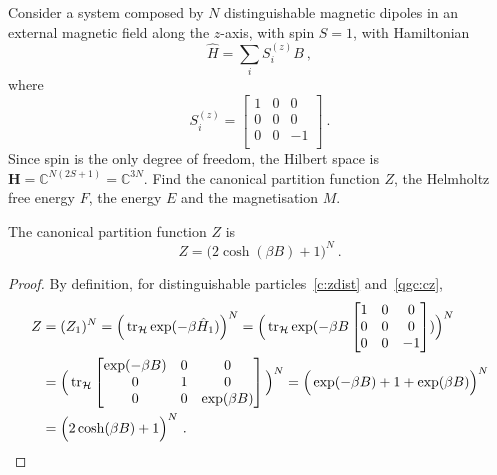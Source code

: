     \begin{exercise}
        Consider a system composed by $N$ distinguishable magnetic dipoles in an external magnetic field along the $z$-axis, with spin $S = 1$, with Hamiltonian 
        \begin{equation*}
            \hat H = \sum_i S^{(z)}_i B ~,
        \end{equation*}
        where
        \begin{equation*}
            S^{(z)}_i = \begin{bmatrix}
                1 & 0 & 0 \\
                0 & 0 & 0 \\
                0 & 0 & - 1 \\
            \end{bmatrix} ~.
        \end{equation*}
        Since spin is the only degree of freedom, the Hilbert space is $\mathbf H = \mathbb C^{N (2S + 1)} = \mathbb C^{3N}$. Find the canonical partition function $Z$, the Helmholtz free energy $F$, the energy $E$ and the magnetisation $M$.
    \end{exercise}

    The canonical partition function $Z$ is 
    \begin{equation*}
        Z = \Big ( 2 \cosh (\beta B) + 1 \Big)^N ~.
    \end{equation*}
    \begin{proof}
        By definition, for distinguishable particles~\eqref{c:zdist} and~\eqref{qgc:cz},
        \begin{equation*}
        \begin{aligned}
            Z & = (Z_1)^N = \Big (\operatorname{tr}_{\mathcal H} \exp(- \beta \hat H_1) \Big)^N = \Big (\operatorname{tr}_{\mathcal H} \exp(- \beta B \begin{bmatrix}
                1 & 0 & 0 \\ 0 & 0 & 0 \\ 0 & 0 & - 1 \\ 
            \end{bmatrix}) \Big)^N \\ & = \Big(\operatorname{tr}_{\mathcal H} \begin{bmatrix}
                \exp(- \beta B) & 0 & 0 \\ 0 & 1 & 0 \\ 0 & 0 & \exp(\beta B) \\ 
            \end{bmatrix} \Big )^N = \Big( \exp(- \beta B) + 1 + \exp(\beta B) \Big)^N \\ & = \Big ( 2 \cosh (\beta B) + 1 \Big)^N ~.
        \end{aligned}
        \end{equation*}
    \end{proof}

